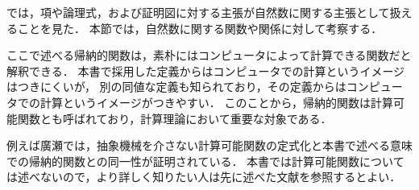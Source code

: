 では，項や論理式，および証明図に対する主張が自然数に関する主張として扱えることを見た．
本節では，自然数に関する関数や関係に対して考察する．

ここで述べる帰納的関数は，素朴にはコンピュータによって計算できる関数だと解釈できる．
本書で採用した定義からはコンピュータでの計算というイメージはつきにくいが，
別の同値な定義も知られており，その定義からはコンピュータでの計算というイメージがつきやすい．
このことから，帰納的関数は計算可能関数とも呼ばれており，計算理論において重要な対象である．

例えば廣瀬\cite{hirose2024}では，抽象機械を介さない計算可能関数の定式化と本書で述べる意味での帰納的関数との同一性が証明されている．
本書では計算可能関数については述べないので，より詳しく知りたい人は先に述べた文献を参照するとよい．

